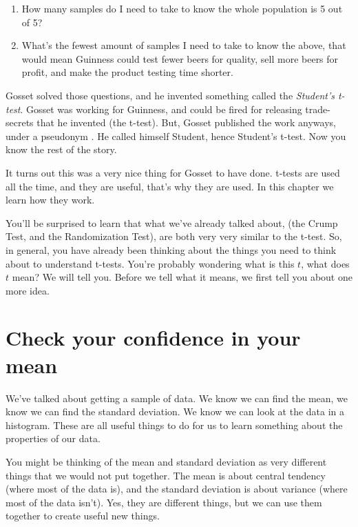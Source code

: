 \documentclass[]{book}
\begin{document}
\begin{enumerate}
\def\labelenumi{\arabic{enumi}.}
\item
  How many samples do I need to take to know the whole population is 5 out of 5?
\item
  What's the fewest amount of samples I need to take to know the above, that would mean Guinness could test fewer beers for quality, sell more beers for profit, and make the product testing time shorter.
\end{enumerate}

Gosset solved those questions, and he invented something called the \emph{Student's t-test}. Gosset was working for Guinness, and could be fired for releasing trade-secrets that he invented (the t-test). But, Gosset published the work anyways, under a pseudonym \citep{Student1908}. He called himself Student, hence Student's t-test. Now you know the rest of the story.

It turns out this was a very nice thing for Gosset to have done. t-tests are used all the time, and they are useful, that's why they are used. In this chapter we learn how they work.

You'll be surprised to learn that what we've already talked about, (the Crump Test, and the Randomization Test), are both very very similar to the t-test. So, in general, you have already been thinking about the things you need to think about to understand t-tests. You're probably wondering what is this \(t\), what does \(t\) mean? We will tell you. Before we tell what it means, we first tell you about one more idea.

\hypertarget{check-your-confidence-in-your-mean}{%
\section{Check your confidence in your mean}\label{check-your-confidence-in-your-mean}}

We've talked about getting a sample of data. We know we can find the mean, we know we can find the standard deviation. We know we can look at the data in a histogram. These are all useful things to do for us to learn something about the properties of our data.

You might be thinking of the mean and standard deviation as very different things that we would not put together. The mean is about central tendency (where most of the data is), and the standard deviation is about variance (where most of the data isn't). Yes, they are different things, but we can use them together to create useful new things.
\end{document}
